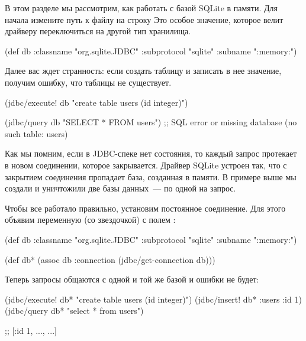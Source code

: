В этом разделе мы рассмотрим, как работать с базой SQLite в памяти. Для начала измените путь к файлу на строку  Это особое значение, которое велит драйверу переключиться на другой тип хранилища.

\begin{english}
  \begin{clojure}
(def db
  {:classname   "org.sqlite.JDBC"
   :subprotocol "sqlite"
   :subname     ":memory:"})
  \end{clojure}
\end{english}

Далее вас ждет странность: если создать таблицу и записать в нее значение, получим ошибку, что таблицы не существует.

\begin{english}
  \begin{clojure}
(jdbc/execute! db "create table users (id integer)")

(jdbc/query db "SELECT * FROM users")
;; SQL error or missing database (no such table: users)
  \end{clojure}
\end{english}

Как мы помним, если в JDBC-спеке нет состояния, то каждый запрос протекает в новом соединении, которое закрывается. Драйвер SQLite устроен так, что с закрытием соединения пропадает база, созданная в памяти. В примере выше мы создали и уничтожили две базы данных~--- по одной на запрос.

Чтобы все работало правильно, установим постоянное соединение. Для этого объявим переменную  (со звездочкой) с полем :

\begin{english}
  \begin{clojure}
(def db
  {:classname   "org.sqlite.JDBC"
   :subprotocol "sqlite"
   :subname     ":memory:"})

(def db*
  (assoc db :connection
         (jdbc/get-connection db)))
  \end{clojure}
\end{english}

Теперь запросы общаются с одной и той же базой и ошибки не будет:

\begin{english}
  \begin{clojure}
(jdbc/execute! db* "create table users (id integer)")
(jdbc/insert! db* :users {:id 1})
(jdbc/query db* "select * from users")

;; [{:id 1, ...}, ...]
  \end{clojure}
\end{english}

